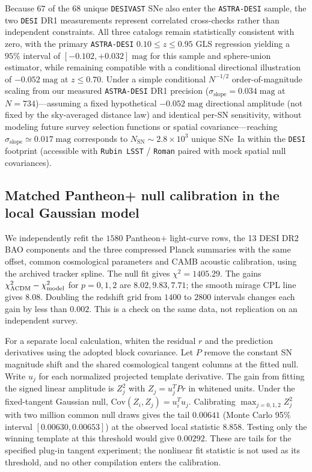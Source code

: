 \documentclass[11pt,a4paper]{article}
\begin{document}
Because $67$ of the $68$ unique \texttt{DESIVAST} SNe also enter the \texttt{ASTRA-DESI} sample, the two \texttt{DESI} DR1 measurements represent correlated cross-checks rather than independent constraints. All three catalogs remain statistically consistent with zero, with the primary \texttt{ASTRA-DESI} $0.10 \le z \le 0.95$ GLS regression yielding a $95\%$ interval of $[-0.102, +0.032]\;\mathrm{mag}$ for this sample and sphere-union estimator, while remaining compatible with a conditional directional illustration of $-0.052\;\mathrm{mag}$ at $z \le 0.70$. Under a simple conditional $N^{-1/2}$ order-of-magnitude scaling from our measured \texttt{ASTRA-DESI} DR1 precision ($\sigma_{\mathrm{slope}} = 0.034\;\mathrm{mag}$ at $N = 734$)---assuming a fixed hypothetical $-0.052\;\mathrm{mag}$ directional amplitude (not fixed by the sky-averaged distance law) and identical per-SN sensitivity, without modeling future survey selection functions or spatial covariance---reaching $\sigma_{\mathrm{slope}} \simeq 0.017\;\mathrm{mag}$ corresponds to $N_{\mathrm{SN}} \sim 2.8 \times 10^3$ unique SNe~Ia within the \texttt{DESI} footprint (accessible with \texttt{Rubin LSST} / \texttt{Roman} paired with mock spatial null covariances).

\subsection{Matched Pantheon+ null calibration in the local Gaussian model}
\label{sec:matched-tangent}
We independently refit the $1580$ Pantheon+ light-curve rows, the 13
DESI DR2 BAO components and the three compressed Planck summaries
with the same offset, common cosmological parameters and CAMB acoustic
calibration, using the archived tracker spline. The null fit gives
$\chi^2=1405.29$. The gains $\chi^2_{\Lambda\mathrm{CDM}}-\chi^2_{\rm model}$
for $p=0,1,2$ are $8.02,9.83,7.71$; the smooth mirage CPL line gives
$8.08$. Doubling the redshift grid from $1400$ to $2800$ intervals
changes each gain by less than $0.002$. This is a check on the same
data, not replication on an independent survey.

For a separate local calculation, whiten the residual $r$ and the
prediction derivatives using the adopted block covariance. Let $P$
remove the constant SN magnitude shift and the shared cosmological
tangent columns at the fitted null. Write $u_j$ for each normalized
projected template derivative. The gain from fitting the signed
linear amplitude is $Z_j^2$ with $Z_j=u_j^{T}Pr$ in whitened units.
Under the fixed-tangent Gaussian null,
$\mathrm{Cov}(Z_i,Z_j)=u_i^Tu_j$. Calibrating $\max_{j=0,1,2}Z_j^2$
with two million common null draws gives the tail $0.00641$
(Monte Carlo 95\% interval $[0.00630,0.00653]$) at the observed local
statistic $8.858$. Testing only the winning template at this threshold
would give $0.00292$. These are tails for the specified plug-in
tangent experiment; the nonlinear fit statistic is not used as its
threshold, and no other compilation enters the calibration.
\end{document}
